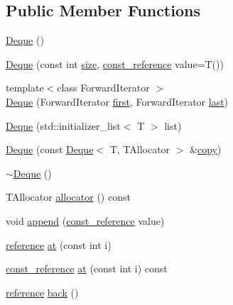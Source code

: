 \subsection*{Public Member Functions}
\begin{DoxyCompactItemize}
\item 
\hyperlink{classprism_1_1_deque_a90d34d381cb969723a6d5b4fd014faf2}{Deque} ()
\item 
\hyperlink{classprism_1_1_deque_ad2a6f29fa001dbc44af3aac3a0518940}{Deque} (const int \hyperlink{classprism_1_1_deque_a16c6d7b9640486229fd379e60e026098}{size}, \hyperlink{classprism_1_1_deque_affa26df70d5123f79a59386056e920c3}{const\+\_\+reference} value=T())
\item 
{\footnotesize template$<$class Forward\+Iterator $>$ }\\\hyperlink{classprism_1_1_deque_abac624703ab651ef2f3f85e31b4ba410}{Deque} (Forward\+Iterator \hyperlink{classprism_1_1_deque_ab33aa2e2ebb794b5a9beabee1b41c8f1}{first}, Forward\+Iterator \hyperlink{classprism_1_1_deque_a2ee25a04680e547ae11c165a087e6806}{last})
\item 
\hyperlink{classprism_1_1_deque_a28fe7a13e1cb730eac228b462d1ad2ac}{Deque} (std\+::initializer\+\_\+list$<$ T $>$ list)
\item 
\hyperlink{classprism_1_1_deque_aba87284e87cfedecedc0311a08639334}{Deque} (const \hyperlink{classprism_1_1_deque}{Deque}$<$ T, T\+Allocator $>$ \&\hyperlink{namespaceprism_ae776f4cd825f79e7af1cf6ee1d90a209}{copy})
\item 
\hyperlink{classprism_1_1_deque_ad1de2312a57209a9b6305f3ec5d7564d}{$\sim$\+Deque} ()
\item 
T\+Allocator \hyperlink{classprism_1_1_deque_aa767dd5352954f58b1b057bc8b0610bc}{allocator} () const 
\item 
void \hyperlink{classprism_1_1_deque_a31093dc317b3f3f2743a8e79c2c40429}{append} (\hyperlink{classprism_1_1_deque_affa26df70d5123f79a59386056e920c3}{const\+\_\+reference} value)
\item 
\hyperlink{classprism_1_1_deque_a035cdb869f46870d62d403d9ff5e3691}{reference} \hyperlink{classprism_1_1_deque_ad232dfa2adb856791d896b464d210900}{at} (const int i)
\item 
\hyperlink{classprism_1_1_deque_affa26df70d5123f79a59386056e920c3}{const\+\_\+reference} \hyperlink{classprism_1_1_deque_a2fc87a01382135599fa3b5aba1579475}{at} (const int i) const 
\item 
\hyperlink{classprism_1_1_deque_a035cdb869f46870d62d403d9ff5e3691}{reference} \hyperlink{classprism_1_1_deque_ad89f5089c397b35579622df71a7c5a20}{back} ()

\end{DoxyCompactItemize}
